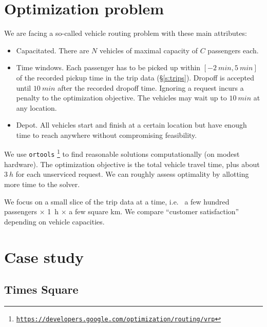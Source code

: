 \documentclass[12pt,notitlepage]{article}
\begin{document}
\section{Optimization problem}

We are facing
a so-called vehicle routing problem with these main attributes:
%
\begin{itemize}
\item
	Capacitated.
	There are $N$ vehicles of maximal capacity of $C$ passengers each.
\item
	Time windows.
	Each passenger has to be picked up
	within $[-\SI{2}{min}, \SI{5}{min}]$
	of
	the recorded pickup time in the trip data (\S\ref{s:trips}).
	Dropoff is accepted until $\SI{10}{min}$
	after the recorded dropoff time.
	Ignoring a request incurs
	a penalty to the optimization objective.	
	The vehicles may wait up to $\SI{10}{min}$
	at any location.
\item
	Depot.
	All vehicles start and finish at a certain location
	but have enough time to reach anywhere
	without compromising feasibility.
\end{itemize}

%

We use \texttt{ortools}%
\footnote{\href{https://developers.google.com/optimization/routing/vrp}{\color{gray} \texttt{https://developers.google.com/optimization/routing/vrp}}}
to find reasonable solutions computationally (on modest hardware).
%
The optimization objective is 
the total vehicle travel time,
plus about $\SI{3}{h}$ for each unserviced request.
%
We can roughly assess optimality
by allotting more time to the solver.

%

We focus on a small slice of 
the trip data at a time,
i.e.~%
a few hundred passengers $\times$ \SI{1}{h} $\times$ a few square \si{km}.
%
We compare ``customer satisfaction''
depending on vehicle capacities.



\section[Case study]{Case study } \label{s:case}

\subsection{Times Square} \label{s:case1}
\end{document}
